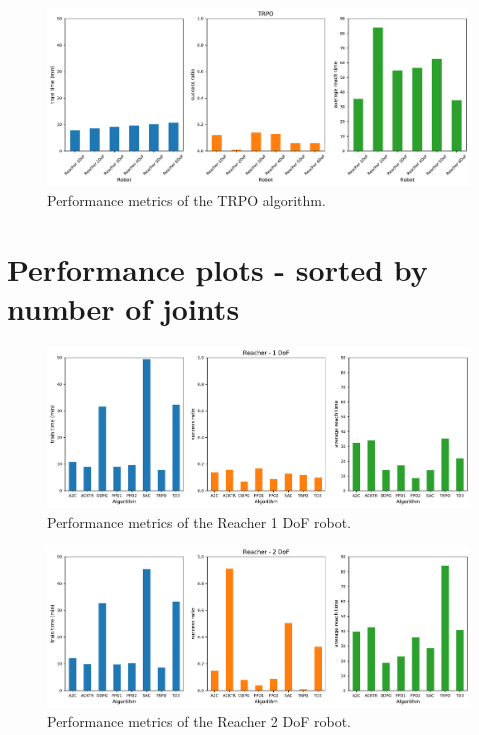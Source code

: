 \documentclass{article}
\begin{document}
\begin{figure}[H]
    \centering
    \includegraphics[width=\textwidth]{../TRPO.pdf}
\caption{Performance metrics of the TRPO algorithm.}
\end{figure}



\section{Performance plots - sorted by number of joints}

\begin{figure}[H]
    \centering
    \includegraphics[width=\textwidth]{../Reacher1Dof-v0/reacher1.pdf}
\caption{Performance metrics of the Reacher 1 DoF robot.}
\end{figure}

\begin{figure}[H]
    \centering
    \includegraphics[width=\textwidth]{../Reacher2Dof-v0/reacher2.pdf}
\caption{Performance metrics of the Reacher 2 DoF robot.}
\end{figure}
\end{document}
